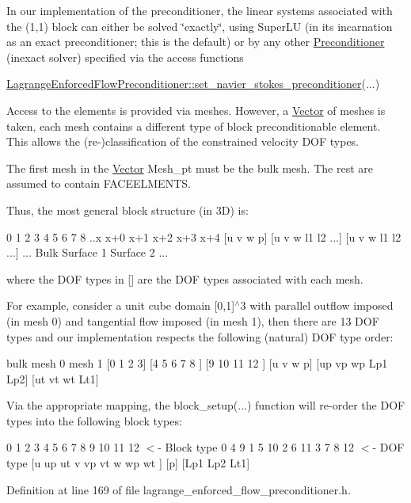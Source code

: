 In our implementation of the preconditioner, the linear systems associated with the (1,1) block can either be solved \char`\"{}exactly\char`\"{}, using Super\+LU (in its incarnation as an exact preconditioner; this is the default) or by any other \hyperlink{classoomph_1_1Preconditioner}{Preconditioner} (inexact solver) specified via the access functions

\hyperlink{classoomph_1_1LagrangeEnforcedFlowPreconditioner_a3512f2a0c6b03977590591a81846c50d}{Lagrange\+Enforced\+Flow\+Preconditioner\+::set\+\_\+navier\+\_\+stokes\+\_\+preconditioner}(...)

Access to the elements is provided via meshes. However, a \hyperlink{classoomph_1_1Vector}{Vector} of meshes is taken, each mesh contains a different type of block preconditionable element. This allows the (re-\/)classification of the constrained velocity D\+OF types.

The first mesh in the \hyperlink{classoomph_1_1Vector}{Vector} Mesh\+\_\+pt must be the \textquotesingle{}bulk\textquotesingle{} mesh. The rest are assumed to contain F\+A\+C\+E\+E\+L\+M\+E\+N\+TS.

Thus, the most general block structure (in 3D) is\+:

0 1 2 3 4 5 6 7 8 ..x x+0 x+1 x+2 x+3 x+4 \mbox{[}u v w p\mbox{]} \mbox{[}u v w l1 l2 ...\mbox{]} \mbox{[}u v w l1 l2 ...\mbox{]} ... Bulk Surface 1 Surface 2 ...

where the D\+OF types in \mbox{[}\mbox{]} are the D\+OF types associated with each mesh.

For example, consider a unit cube domain \mbox{[}0,1\mbox{]}$^\wedge$3 with parallel outflow imposed (in mesh 0) and tangential flow imposed (in mesh 1), then there are 13 D\+OF types and our implementation respects the following (natural) D\+OF type order\+:

bulk mesh 0 mesh 1 \mbox{[}0 1 2 3\mbox{]} \mbox{[}4 5 6 7 8 \mbox{]} \mbox{[}9 10 11 12 \mbox{]} \mbox{[}u v w p\mbox{]} \mbox{[}up vp wp Lp1 Lp2\mbox{]} \mbox{[}ut vt wt Lt1\mbox{]}

Via the appropriate mapping, the block\+\_\+setup(...) function will re-\/order the D\+OF types into the following block types\+:

0 1 2 3 4 5 6 7 8 9 10 11 12 $<$-\/ Block type 0 4 9 1 5 10 2 6 11 3 7 8 12 $<$-\/ D\+OF type \mbox{[}u up ut v vp vt w wp wt \mbox{]} \mbox{[}p\mbox{]} \mbox{[}Lp1 Lp2 Lt1\mbox{]} 

Definition at line 169 of file lagrange\+\_\+enforced\+\_\+flow\+\_\+preconditioner.\+h.



